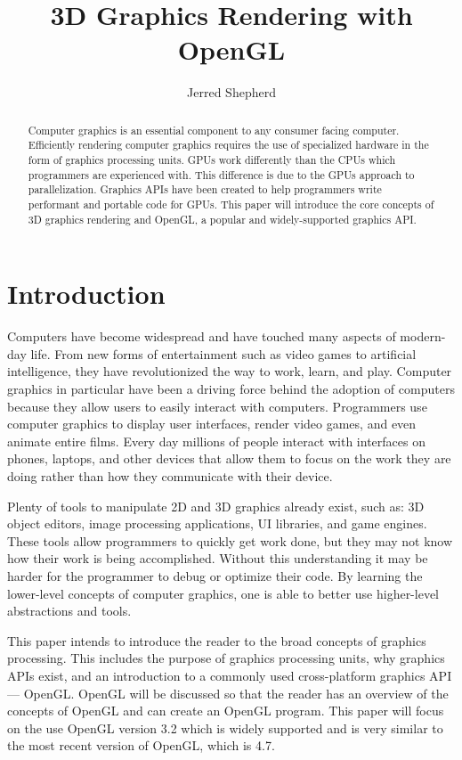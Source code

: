 \documentclass{article}
\title{\Large\textbf{3D Graphics Rendering with OpenGL}}
\author{Jerred Shepherd}
\begin{document}
\begin{titlingpage}
    \maketitle
    \begin{abstract}
    Computer graphics is an essential component to any consumer facing computer. Efficiently rendering computer graphics requires the use of specialized hardware in the form of graphics processing units. GPUs work differently than the CPUs which programmers are experienced with. This difference is due to the GPUs approach to parallelization. Graphics APIs have been created to help programmers write performant and portable code for GPUs. This paper will introduce the core concepts of 3D graphics rendering and OpenGL, a popular and widely-supported graphics API.
    \end{abstract}
\end{titlingpage}

\section{Introduction}
Computers have become widespread and have touched many aspects of modern-day life. From new forms of entertainment such as video games to artificial intelligence, they have revolutionized the way to work, learn, and play. Computer graphics in particular have been a driving force behind the adoption of computers because they allow users to easily interact with computers. Programmers use computer graphics to display user interfaces, render video games, and even animate entire films. Every day millions of people interact with interfaces on phones, laptops, and other devices that allow them to focus on the work they are doing rather than how they communicate with their device. %

Plenty of tools to manipulate 2D and 3D graphics already exist, such as: 3D object editors, image processing applications, UI libraries, and game engines. These tools allow programmers to quickly get work done, but they may not know how their work is being accomplished. Without this understanding it may be harder for the programmer to debug or optimize their code. By learning the lower-level concepts of computer graphics, one is able to better use higher-level abstractions and tools. %

This paper intends to introduce the reader to the broad concepts of graphics processing. This includes the purpose of graphics processing units, why graphics APIs exist, and an introduction to a commonly used cross-platform graphics API --- OpenGL. OpenGL will be discussed so that the reader has an overview of the concepts of OpenGL and can create an OpenGL program. This paper will focus on the use OpenGL version 3.2 which is widely supported and is very similar to the most recent version of OpenGL, which is 4.7.
\end{document}

